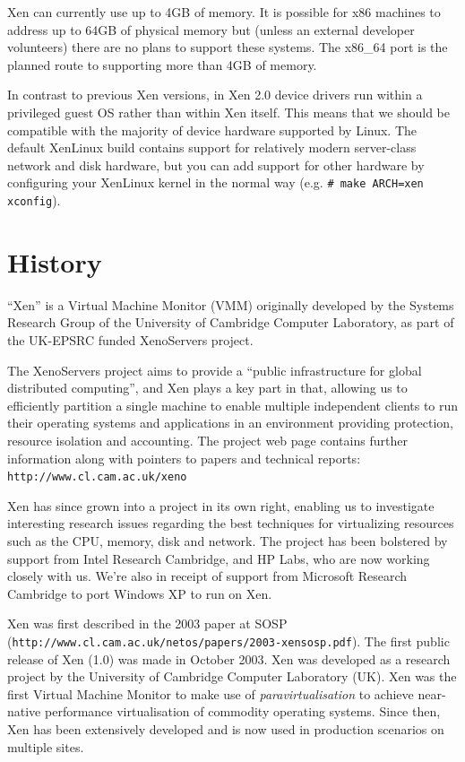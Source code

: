 \documentclass[11pt,twoside,final,openright]{xenstyle}
\begin{document}
Xen can currently use up to 4GB of memory.  It is possible for x86
machines to address up to 64GB of physical memory but (unless an
external developer volunteers) there are no plans to support these
systems.  The x86\_64 port is the planned route to supporting more
than 4GB of memory.

In contrast to previous Xen versions, in Xen 2.0 device drivers run
within a privileged guest OS rather than within Xen itself. This means
that we should be compatible with the majority of device hardware
supported by Linux.  The default XenLinux build contains support for
relatively modern server-class network and disk hardware, but you can
add support for other hardware by configuring your XenLinux kernel in
the normal way (e.g. \verb_# make ARCH=xen xconfig_).

\section{History}


``Xen'' is a Virtual Machine Monitor (VMM) originally developed by the
Systems Research Group of the University of Cambridge Computer
Laboratory, as part of the UK-EPSRC funded XenoServers project.

The XenoServers project aims to provide a ``public infrastructure for
global distributed computing'', and Xen plays a key part in that,
allowing us to efficiently partition a single machine to enable
multiple independent clients to run their operating systems and
applications in an environment providing protection, resource
isolation and accounting.  The project web page contains further
information along with pointers to papers and technical reports:
{\tt http://www.cl.cam.ac.uk/xeno}

Xen has since grown into a project in its own right, enabling us to
investigate interesting research issues regarding the best techniques
for virtualizing resources such as the CPU, memory, disk and network.
The project has been bolstered by support from Intel Research
Cambridge, and HP Labs, who are now working closely with us. We're
also in receipt of support from Microsoft Research Cambridge to port
Windows XP to run on Xen.

Xen was first described in the 2003 paper at SOSP \\
({\tt http://www.cl.cam.ac.uk/netos/papers/2003-xensosp.pdf}).
The first public release of Xen (1.0) was made in October 2003.  Xen
was developed as a research project by the University of Cambridge
Computer Laboratory (UK).  Xen was the first Virtual Machine Monitor
to make use of {\em paravirtualisation} to achieve near-native
performance virtualisation of commodity operating systems.  Since
then, Xen has been extensively developed and is now used in production
scenarios on multiple sites.
\end{document}
